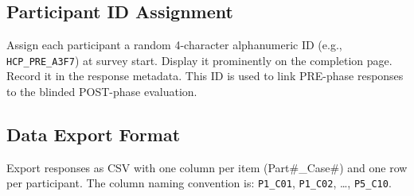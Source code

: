 \documentclass[11pt,a4paper]{article}
\begin{document}
\subsection*{Participant ID Assignment}

Assign each participant a random 4-character alphanumeric ID (e.g., \texttt{HCP\_PRE\_A3F7}) at survey start. Display it prominently on the completion page. Record it in the response metadata. This ID is used to link PRE-phase responses to the blinded POST-phase evaluation.

\subsection*{Data Export Format}

Export responses as CSV with one column per item (Part\#\_Case\#) and one row per participant. The column naming convention is: \texttt{P1\_C01}, \texttt{P1\_C02}, \ldots, \texttt{P5\_C10}.
\end{document}
